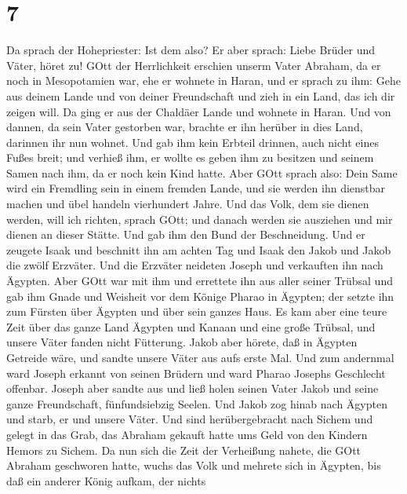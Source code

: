 \hypertarget{section-6}{%
\section{7}\label{section-6}}

 Da sprach der Hohepriester: Ist dem also?  Er
aber sprach: Liebe Brüder und Väter, höret zu! GOtt der Herrlichkeit
erschien unserm Vater Abraham, da er noch in Mesopotamien war, ehe er
wohnete in Haran,  und er sprach zu ihm: Gehe aus deinem
Lande und von deiner Freundschaft und zieh in ein Land, das ich dir
zeigen will.  Da ging er aus der Chaldäer Lande und wohnete
in Haran. Und von dannen, da sein Vater gestorben war, brachte er ihn
herüber in dies Land, darinnen ihr nun wohnet.  Und gab ihm
kein Erbteil drinnen, auch nicht eines Fußes breit; und verhieß ihm, er
wollte es geben ihm zu besitzen und seinem Samen nach ihm, da er noch
kein Kind hatte.  Aber GOtt sprach also: Dein Same wird ein
Fremdling sein in einem fremden Lande, und sie werden ihn dienstbar
machen und übel handeln vierhundert Jahre.  Und das Volk,
dem sie dienen werden, will ich richten, sprach GOtt; und danach werden
sie ausziehen und mir dienen an dieser Stätte.  Und gab ihm
den Bund der Beschneidung. Und er zeugete Isaak und beschnitt ihn am
achten Tag und Isaak den Jakob und Jakob die zwölf Erzväter.
 Und die Erzväter neideten Joseph und verkauften ihn nach
Ägypten. Aber GOtt war mit ihm  und errettete ihn aus aller
seiner Trübsal und gab ihm Gnade und Weisheit vor dem Könige Pharao in
Ägypten; der setzte ihn zum Fürsten über Ägypten und über sein ganzes
Haus.  Es kam aber eine teure Zeit über das ganze Land
Ägypten und Kanaan und eine große Trübsal, und unsere Väter fanden nicht
Fütterung.  Jakob aber hörete, daß in Ägypten Getreide
wäre, und sandte unsere Väter aus aufs erste Mal.  Und zum
andernmal ward Joseph erkannt von seinen Brüdern und ward Pharao Josephs
Geschlecht offenbar.  Joseph aber sandte aus und ließ holen
seinen Vater Jakob und seine ganze Freundschaft, fünfundsiebzig Seelen.
 Und Jakob zog hinab nach Ägypten und starb, er und unsere
Väter.  Und sind herübergebracht nach Sichem und gelegt in
das Grab, das Abraham gekauft hatte ums Geld von den Kindern Hemors zu
Sichem.  Da nun sich die Zeit der Verheißung nahete, die
GOtt Abraham geschworen hatte, wuchs das Volk und mehrete sich in
Ägypten,  bis daß ein anderer König aufkam, der nichts
